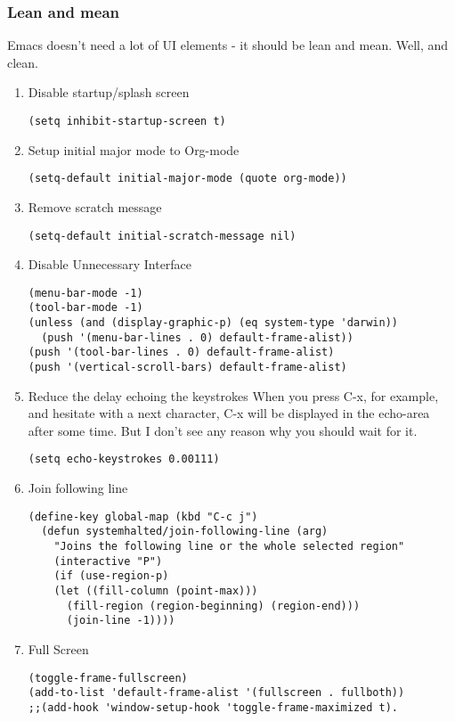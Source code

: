 \documentclass[11pt]{article}
\begin{document}
\subsubsection{Lean and mean}
\label{sec:org8fed851}
Emacs doesn’t need a lot of UI elements - it should be lean and mean. Well, and clean. 
\begin{enumerate}
\item Disable startup/splash screen
\label{sec:org062badb}
\begin{verbatim}
(setq inhibit-startup-screen t)
\end{verbatim}

\item Setup initial major mode to Org-mode
\label{sec:orgbbc8eef}
\begin{verbatim}
(setq-default initial-major-mode (quote org-mode))
\end{verbatim}

\item Remove scratch message
\label{sec:orgb4e5661}
\begin{verbatim}
(setq-default initial-scratch-message nil)
\end{verbatim}

\item Disable Unnecessary Interface
\label{sec:orgb327a10}
\begin{verbatim}
(menu-bar-mode -1)
(tool-bar-mode -1)
(unless (and (display-graphic-p) (eq system-type 'darwin))
  (push '(menu-bar-lines . 0) default-frame-alist))
(push '(tool-bar-lines . 0) default-frame-alist)
(push '(vertical-scroll-bars) default-frame-alist)
\end{verbatim}
\item Reduce the delay echoing the keystrokes
\label{sec:orga28f1d2}
When you press C-x, for example, and hesitate with a next character, C-x will be displayed in the echo-area after some time. But I don’t see any reason why you should wait for it.
\begin{verbatim}
(setq echo-keystrokes 0.00111)
\end{verbatim}
\item Join following line
\label{sec:org062abc5}

\begin{verbatim}
(define-key global-map (kbd "C-c j")
  (defun systemhalted/join-following-line (arg)
    "Joins the following line or the whole selected region"
    (interactive "P")
    (if (use-region-p)
	(let ((fill-column (point-max)))
	  (fill-region (region-beginning) (region-end)))
      (join-line -1))))
\end{verbatim}

\item Full Screen
\label{sec:org9752210}
\begin{verbatim}
(toggle-frame-fullscreen)
(add-to-list 'default-frame-alist '(fullscreen . fullboth))
;;(add-hook 'window-setup-hook 'toggle-frame-maximized t).
\end{verbatim}
\end{enumerate}
\end{document}
